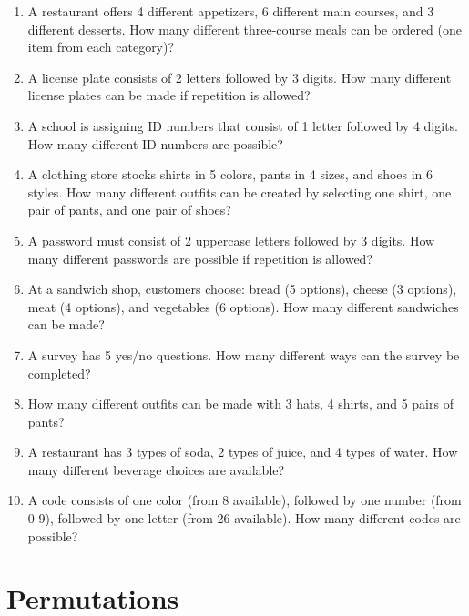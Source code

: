 \documentclass[12pt]{article}
\begin{document}
\begin{enumerate}

\item A restaurant offers 4 different appetizers, 6 different main courses, and 3 different desserts. How many different three-course meals can be ordered (one item from each category)?

\item A license plate consists of 2 letters followed by 3 digits. How many different license plates can be made if repetition is allowed?

\item A school is assigning ID numbers that consist of 1 letter followed by 4 digits. How many different ID numbers are possible?

\item A clothing store stocks shirts in 5 colors, pants in 4 sizes, and shoes in 6 styles. How many different outfits can be created by selecting one shirt, one pair of pants, and one pair of shoes?

\item A password must consist of 2 uppercase letters followed by 3 digits. How many different passwords are possible if repetition is allowed?

\item At a sandwich shop, customers choose: bread (5 options), cheese (3 options), meat (4 options), and vegetables (6 options). How many different sandwiches can be made?

\item A survey has 5 yes/no questions. How many different ways can the survey be completed?

\item How many different outfits can be made with 3 hats, 4 shirts, and 5 pairs of pants?

\item A restaurant has 3 types of soda, 2 types of juice, and 4 types of water. How many different beverage choices are available?

\item A code consists of one color (from 8 available), followed by one number (from 0-9), followed by one letter (from 26 available). How many different codes are possible?

\end{enumerate}

\section{Permutations}
\end{document}
